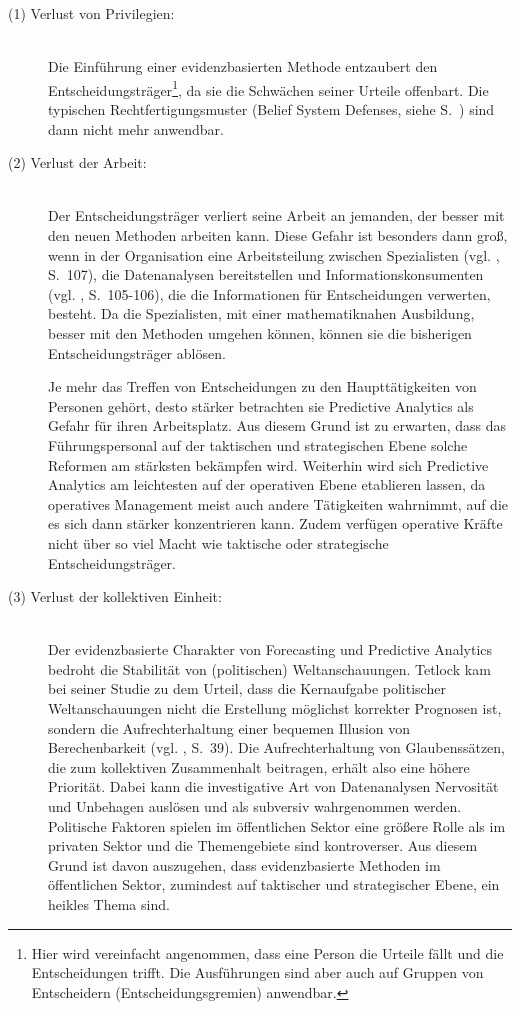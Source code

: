 \begin{description}
\item[(1) Verlust von Privilegien:] \hfill \\
Die Einführung einer evidenzbasierten Methode entzaubert den Entscheidungsträger\footnote{
Hier wird vereinfacht angenommen, dass eine Person die Urteile fällt und die Entscheidungen
trifft. Die Ausführungen sind aber auch auf Gruppen von Entscheidern (Entscheidungsgremien)
anwendbar.
}, da sie die Schwächen seiner Urteile offenbart. Die typischen Rechtfertigungsmuster
(Belief System Defenses, siehe S.~\xcom)
sind dann nicht mehr anwendbar.

\item[(2) Verlust der Arbeit:] \hfill \\
Der Entscheidungsträger verliert seine Arbeit an jemanden, der besser mit den neuen Methoden
arbeiten kann. Diese Gefahr ist besonders dann groß, wenn in der Organisation eine Arbeitsteilung
zwischen Spezialisten (vgl. \cite{Gluchowski}, S.~107), die Datenanalysen bereitstellen und Informationskonsumenten
(vgl. \cite{Gluchowski}, S.~105-106), die die Informationen für Entscheidungen verwerten, besteht. 
Da die Spezialisten, mit einer mathematiknahen Ausbildung, besser mit den Methoden umgehen können, 
können sie die bisherigen Entscheidungsträger ablösen.

Je mehr das Treffen von Entscheidungen zu den Haupttätigkeiten von Personen
gehört, desto stärker betrachten sie Predictive Analytics als Gefahr für ihren
Arbeitsplatz. Aus diesem Grund ist zu erwarten, dass das Führungspersonal auf der taktischen
und strategischen Ebene solche Reformen am stärksten bekämpfen wird. Weiterhin wird sich Predictive
Analytics am leichtesten auf der operativen Ebene etablieren lassen, da operatives Management meist
auch andere Tätigkeiten wahrnimmt, auf die es sich dann stärker konzentrieren kann. Zudem verfügen
operative Kräfte nicht über so viel Macht wie taktische oder strategische Entscheidungsträger.

\item[(3) Verlust der kollektiven Einheit:] \hfill \\
Der evidenzbasierte Charakter von Forecasting und Predictive Analytics bedroht die Stabilität
von (politischen) Weltanschauungen.
Tetlock kam bei seiner Studie zu dem Urteil, dass die Kernaufgabe politischer Weltanschauungen
nicht die Erstellung möglichst korrekter Prognosen ist, sondern die
Aufrechterhaltung einer bequemen Illusion von Berechenbarkeit
(vgl. \cite{Tetlock}, S.~39). Die Aufrechterhaltung von Glaubenssätzen, die zum
kollektiven Zusammenhalt beitragen, erhält also eine höhere Priorität.
Dabei kann die investigative Art von Datenanalysen Nervosität und Unbehagen auslösen und als
subversiv wahrgenommen werden. Politische Faktoren spielen im öffentlichen Sektor eine größere Rolle als
im privaten Sektor und die Themengebiete sind kontroverser. Aus diesem Grund ist davon auszugehen, dass
evidenzbasierte Methoden im öffentlichen Sektor, zumindest auf taktischer und strategischer Ebene,
ein heikles Thema sind. 

\end{description}

